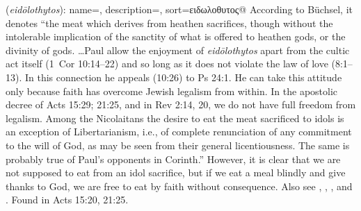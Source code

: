 \item[Idol meat,]

(\textit{eidōlothytos}):
{
    name=,
    description={},
    sort=ειδωλοθυτος@
}
According to Büchsel, it denotes ``the meat which derives from heathen sacrifices, though without the intolerable implication of the sanctity of what is offered to heathen gods, or the divinity of gods. \ldots Paul allow the enjoyment of \emph{eidōlothytos} apart from the cultic act itself (1~Cor 10:14--22) and so long as it does not violate the law of love (8:1--13). In this connection he appeals (10:26) to Ps 24:1. He can take this attitude only because faith has overcome Jewish legalism from within. In the apostolic decree of Acts 15:29; 21:25, and in Rev 2:14, 20, we do not have full freedom from legalism. Among the Nicolaitans the desire to eat the meat sacrificed to idols is an exception of Libertarianism, i.e., of complete renunciation of any commitment to the will of God, as may be seen from their general licentiousness. The same is probably true of Paul's opponents in Corinth.'' 
However, it is clear that we are not supposed to eat from an idol sacrifice, but if we eat a meal blindly and give thanks to God, we are free to eat by faith without consequence. Also see , , , and .
Found in Acts 15:20, 21:25.
